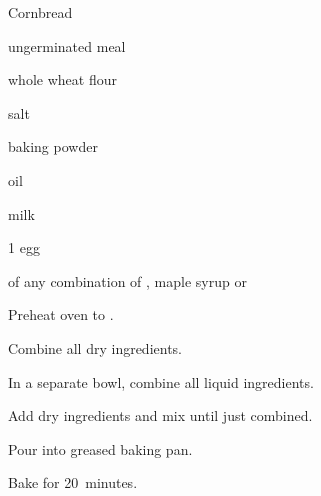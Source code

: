\begin{recipe}{Cornbread}{}{}

\begin{ingredients}
\item {} ungerminated  meal
\item {} whole wheat flour
\item \tp{\half} salt
\item {} baking powder
\item {} oil
\item {} milk
\item 1 egg
\item {} of any combination of , maple syrup or 
\end{ingredients}

\begin{directions}
\item Preheat oven to .
\item Combine all dry ingredients.
\item In a separate bowl, combine all liquid ingredients.
\item Add dry ingredients and mix until just combined.
\item Pour into  greased baking pan.
\item Bake for 20~minutes.
\end{directions}
\end{recipe}
